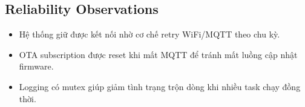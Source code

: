 \subsection{Reliability Observations}
\begin{itemize}
    \item Hệ thống giữ được kết nối nhờ cơ chế retry WiFi/MQTT theo chu kỳ.
    \item OTA subscription được reset khi mất MQTT để tránh mất luồng cập nhật firmware.
    \item Logging có mutex giúp giảm tình trạng trộn dòng khi nhiều task chạy đồng thời.
\end{itemize}
